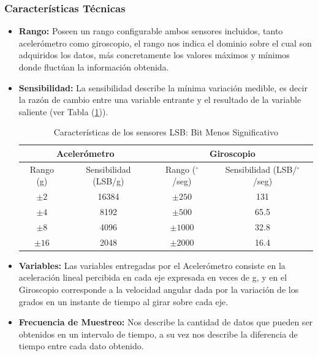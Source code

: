 \documentclass[12pt,a4paper]{article}
\newcommand{\grad}{$^{\circ}$}
\begin{document}
\newpage
\subsubsection{Características Técnicas}

\begin{itemize}
	
	\item \textbf{Rango:} Poseen un rango configurable ambos sensores incluidos, tanto acelerómetro como giroscopio, el rango nos indica el dominio sobre el cual son adquiridos los datos, más concretamente los valores máximos y mínimos donde fluctúan la información obtenida.
	
	\item \textbf{Sensibilidad:} La sensibilidad describe la mínima variación medible, es decir la razón de cambio entre una variable entrante y el resultado de la variable saliente (ver Tabla (\ref{table:caracteristicasSensor})).
	
	\begin{table}[H]
		\centering
		\begin{tabular}{|c|c|c|c|}
			\hline
			\multicolumn{2}{|c|}{Acelerómetro} &\multicolumn{2}{|c|}{Giroscopio}   \\
			\hline
			Rango (g)        & Sensibilidad (LSB/g)  & Rango (\grad/seg)     & Sensibilidad (LSB/\grad/seg)\\ \hline
			$\pm 2$     &  16384 & $\pm 250 $  	& 	131      	\\ 
			$\pm 4$     &  8192  & $\pm 500 $ 	& 	65.5     	\\
			$\pm 8$     &  4096  & $\pm 1000$  	& 	32.8       	\\
			$\pm 16$    &  2048  & $\pm 2000$   & 	16.4      	\\ 
			\hline
		\end{tabular}
		\caption{Características de los sensores LSB: Bit Menos Significativo}
		\label{table:caracteristicasSensor}
	\end{table}
	
	\item \textbf{Variables:} Las variables entregadas por el Acelerómetro consiste en la aceleración lineal percibida en cada eje expresada en veces de g, y en el Giroscopio corresponde  a la velocidad angular dada por la variación de los grados en un instante de tiempo al girar sobre cada eje.
	
	\item \textbf{Frecuencia de Muestreo:} Nos describe la cantidad de datos que pueden ser obtenidos en un intervalo de tiempo, a su vez nos describe la diferencia de tiempo entre cada dato obtenido.
	

\end{itemize}
\end{document}
